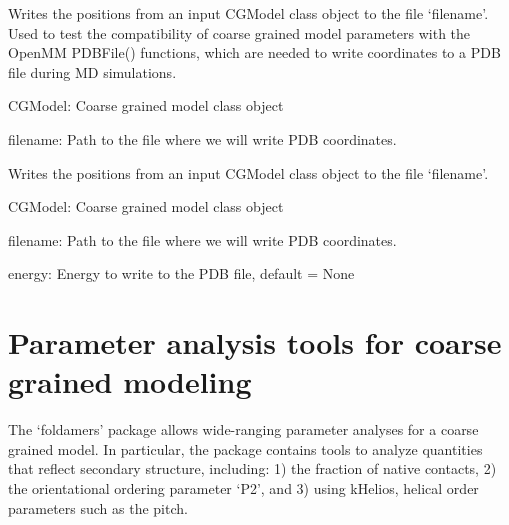 \documentclass[letterpaper,12pt,english,openany,oneside]{sphinxmanual}
\begin{document}

\begin{fulllineitems}
\label{\detokenize{utilities:utilities.iotools.write_cg_pdb}}
Writes the positions from an input CGModel class object to the file ‘filename’.  Used to test the compatibility of coarse grained model parameters with the OpenMM PDBFile() functions, which are needed to write coordinates to a PDB file during MD simulations.

CGModel: Coarse grained model class object

filename: Path to the file where we will write PDB coordinates.

\end{fulllineitems}


\begin{fulllineitems}
\label{\detokenize{utilities:utilities.iotools.write_pdbfile_without_topology}}
Writes the positions from an input CGModel class object to the file ‘filename’.

CGModel: Coarse grained model class object

filename: Path to the file where we will write PDB coordinates.

energy: Energy to write to the PDB file, default = None

\end{fulllineitems}



\chapter{Parameter analysis tools for coarse grained modeling}
\label{\detokenize{parameters:parameter-analysis-tools-for-coarse-grained-modeling}}\label{\detokenize{parameters::doc}}
The ‘foldamers’ package allows wide-ranging parameter analyses for a coarse grained model.  In particular, the package contains tools to analyze quantities that reflect secondary structure, including: 1) the fraction of native contacts, 2) the orientational ordering parameter ‘P2’, and 3) using kHelios, helical order parameters such as the pitch.
\end{document}
